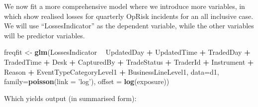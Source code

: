 \documentclass[]{DissertateUSU}
\newenvironment{Shaded}{\begin{snugshade}}{\end{snugshade}}
\newcommand{\KeywordTok}[1]{\textcolor[rgb]{0.13,0.29,0.53}{\textbf{#1}}}
\newcommand{\DataTypeTok}[1]{\textcolor[rgb]{0.13,0.29,0.53}{#1}}
\newcommand{\StringTok}[1]{\textcolor[rgb]{0.31,0.60,0.02}{#1}}
\newcommand{\OperatorTok}[1]{\textcolor[rgb]{0.81,0.36,0.00}{\textbf{#1}}}
\newcommand{\NormalTok}[1]{#1}
\begin{document}
\doublespacing

We now fit a more comprehensive model where we introduce more variables,
in which show realised losses for quarterly OpRisk incidents for an all
inclusive case. We will use ``LossesIndicator'' as the dependent
variable, while the other variables will be predictor variables.

\singlespacing

\begin{Shaded}
\begin{Highlighting}[]
\NormalTok{freqfit <-}\StringTok{ }\KeywordTok{glm}\NormalTok{(LossesIndicator }\OperatorTok{~}\StringTok{ }\NormalTok{UpdatedDay }\OperatorTok{+}\StringTok{ }\NormalTok{UpdatedTime }\OperatorTok{+}
\StringTok{                 }\NormalTok{TradedDay }\OperatorTok{+}\StringTok{ }\NormalTok{TradedTime }\OperatorTok{+}\StringTok{ }\NormalTok{Desk }\OperatorTok{+}\StringTok{ }\NormalTok{CapturedBy }\OperatorTok{+}
\StringTok{                 }\NormalTok{TradeStatus }\OperatorTok{+}\StringTok{ }\NormalTok{TraderId }\OperatorTok{+}\StringTok{ }\NormalTok{Instrument }\OperatorTok{+}\StringTok{ }\NormalTok{Reason}
               \OperatorTok{+}\StringTok{ }\NormalTok{EventTypeCategoryLevel1 }\OperatorTok{+}\StringTok{ }\NormalTok{BusinessLineLevel1,}
\DataTypeTok{data=}\NormalTok{d1, }\DataTypeTok{family=}\KeywordTok{poisson}\NormalTok{(}\DataTypeTok{link =} \StringTok{'log'}\NormalTok{), }\DataTypeTok{offset =} \KeywordTok{log}\NormalTok{(exposure))}
\end{Highlighting}
\end{Shaded}

\doublespacing

Which yields output (in summarised form):

\singlespacing
\end{document}
